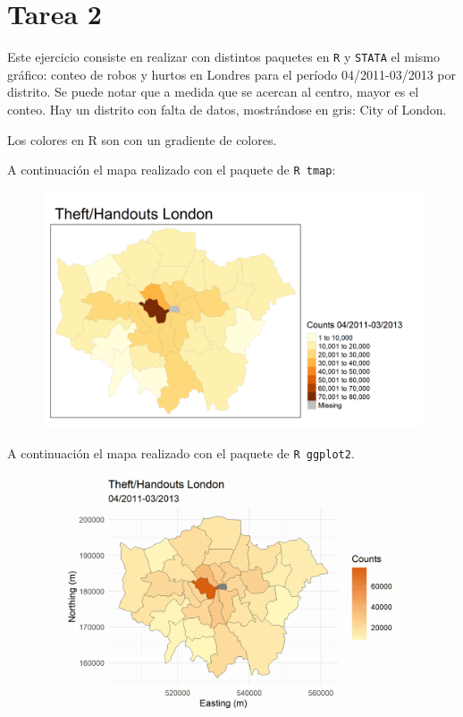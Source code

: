 \documentclass[9pt]{article}
\begin{document}
\section*{Tarea 2}
Este ejercicio consiste en realizar con distintos paquetes en \texttt{R} y \texttt{STATA} el mismo gr\'afico: conteo de robos y hurtos en Londres para el per\'iodo 04/2011-03/2013 por distrito. Se puede notar que a medida que se acercan al centro, mayor es el conteo. Hay un distrito con falta de datos, mostr\'andose en gris: City of London.

Los colores en R son con un gradiente de colores. 

A continuaci\'on el mapa realizado con el paquete de \texttt{R tmap}:
\begin{figure}[H]
    \centering
    \includegraphics{thieftm.png}
\end{figure}
A continuaci\'on el mapa realizado con el paquete de \texttt{R ggplot2}.
\begin{figure}[H]
    \centering
    \includegraphics{thiefgg.png}
\end{figure}
\end{document}
